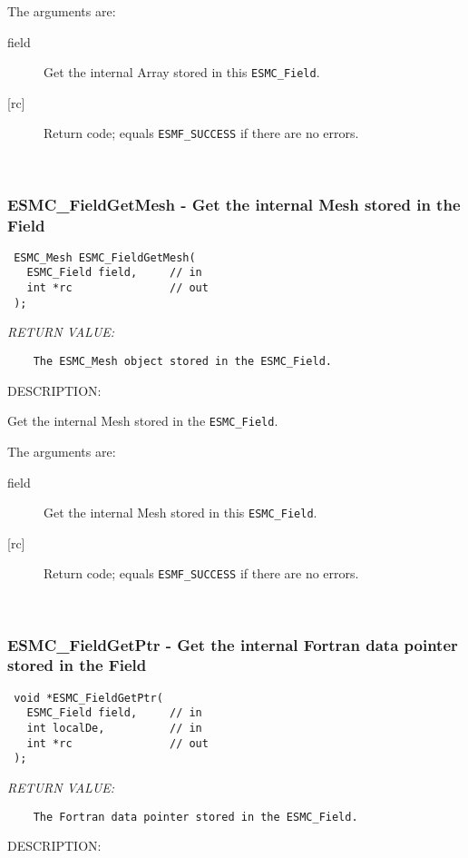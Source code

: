     The arguments are:
    \begin{description}
    \item[field]
      Get the internal Array stored in this {\tt ESMC\_Field}.
    \item[{[rc]}]
      Return code; equals {\tt ESMF\_SUCCESS} if there are no errors.
    \end{description}
   
 
\mbox{}\hrulefill\ 
 
\subsubsection [ESMC\_FieldGetMesh] {ESMC\_FieldGetMesh - Get the internal Mesh stored in the Field}


  
\begin{verbatim} ESMC_Mesh ESMC_FieldGetMesh(
   ESMC_Field field,     // in
   int *rc               // out
 );
 \end{verbatim}{\em RETURN VALUE:}
\begin{verbatim}    The ESMC_Mesh object stored in the ESMC_Field.\end{verbatim}
{\sf DESCRIPTION:\\ }


  
    Get the internal Mesh stored in the {\tt ESMC\_Field}.
  
    The arguments are:
    \begin{description}
    \item[field]
      Get the internal Mesh stored in this {\tt ESMC\_Field}.
    \item[{[rc]}]
      Return code; equals {\tt ESMF\_SUCCESS} if there are no errors.
    \end{description}
   
 
\mbox{}\hrulefill\ 
 
\subsubsection [ESMC\_FieldGetPtr] {ESMC\_FieldGetPtr - Get the internal Fortran data pointer stored in the Field}


  
\begin{verbatim} void *ESMC_FieldGetPtr(
   ESMC_Field field,     // in
   int localDe,          // in
   int *rc               // out
 );
 \end{verbatim}{\em RETURN VALUE:}
\begin{verbatim}    The Fortran data pointer stored in the ESMC_Field.\end{verbatim}
{\sf DESCRIPTION:\\ }


